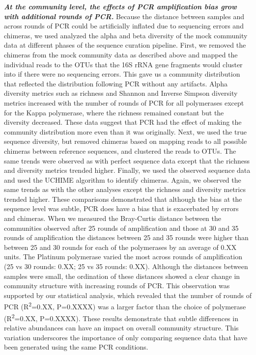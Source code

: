 \documentclass[11pt,]{article}
\begin{document}
\textbf{\emph{At the community level, the effects of PCR amplification
bias grow with additional rounds of PCR.}} Because the distance between
samples and across rounds of PCR could be artificially inflated due to
sequencing errors and chimeras, we used analyzed the alpha and beta
diversity of the mock community data at different phases of the sequence
curation pipeline. First, we removed the chimeras from the mock
community data as described above and mapped the individual reads to the
OTUs that the 16S rRNA gene fragments would cluster into if there were
no sequencing errors. This gave us a community distribution that
reflected the distribution following PCR without any artifacts. Alpha
diversity metrics such as richness and Shannon and Inverse Simpson
diversity metrics increased with the number of rounds of PCR for all
polymerases except for the Kappa polymerase, where the richness remained
constant but the diversity decreased. These data suggest that PCR had
the effect of making the community distribution more even than it was
originally. Next, we used the true sequence diversity, but removed
chimeras based on mapping reads to all possible chimeras between
reference sequences, and clustered the reads to OTUs. The same trends
were observed as with perfect sequence data except that the richness and
diversity metrics trended higher. Finally, we used the observed sequence
data and used the UCHIME algorithm to identify chimeras. Again, we
observed the same trends as with the other analyses except the richness
and diversity metrics trended higher. These comparisons demonstrated
that although the bias at the sequence level was subtle, PCR does have a
bias that is exacerbated by errors and chimeras. When we measured the
Bray-Curtis distance between the communities observed after 25 rounds of
amplification and those at 30 and 35 rounds of amplification the
distances between 25 and 35 rounds were higher than between 25 and 30
rounds for each of the polymerases by an average of 0.XX units. The
Platinum polymerase varied the most across rounds of amplification (25
vs 30 rounds: 0.XX; 25 vs 35 rounds: 0.XX). Although the distances
between samples were small, the ordination of these distances showed a
clear change in community structure with increasing rounds of PCR. This
observation was supported by our statistical analysis, which revealed
that the number of rounds of PCR (R\textsuperscript{2}=0.XX, P=0.XXXX)
was a larger factor than the choice of polymerase
(R\textsuperscript{2}=0.XX, P=0.XXXX). These results demonstrate that
subtle differences in relative abundances can have an impact on overall
community structure. This variation underscores the importance of only
comparing sequence data that have been generated using the same PCR
conditions.
\end{document}
